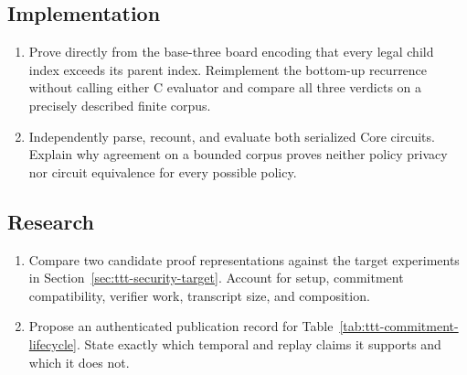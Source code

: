 \subsection*{Implementation}
\begin{enumerate}
    \item Prove directly from the base-three board encoding that every legal
    child index exceeds its parent index. Reimplement the bottom-up recurrence
    without calling either C evaluator and compare all three verdicts on a
    precisely described finite corpus.
    \item Independently parse, recount, and evaluate both serialized Core
    circuits. Explain why agreement on a bounded corpus proves neither policy
    privacy nor circuit equivalence for every possible policy.
\end{enumerate}

\subsection*{Research}
\begin{enumerate}
    \item Compare two candidate proof representations against the target
    experiments in Section~\ref{sec:ttt-security-target}. Account for setup,
    commitment compatibility, verifier work, transcript size, and composition.
    \item Propose an authenticated publication record for
    Table~\ref{tab:ttt-commitment-lifecycle}. State exactly which temporal and
    replay claims it supports and which it does not.
\end{enumerate}
